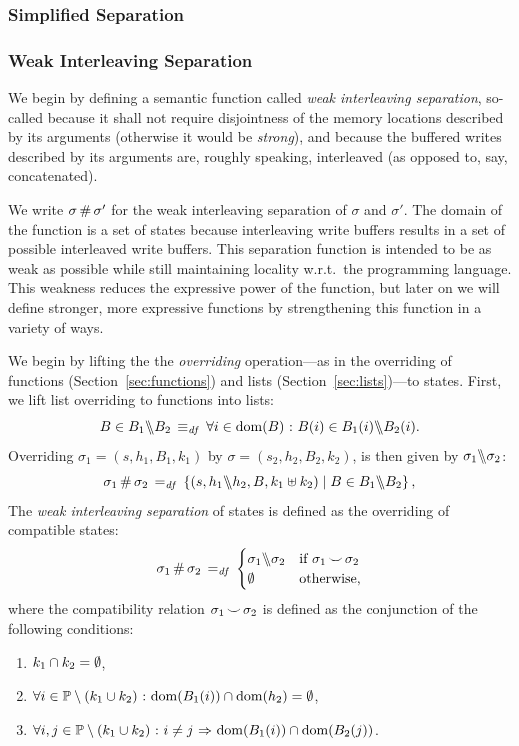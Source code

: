 \documentclass[11pt]{article}
\begin{document}
\subsubsection{Simplified Separation}



\subsubsection{Weak Interleaving Separation}

We begin by defining a semantic function called \emph{weak interleaving separation}, so-called because it shall not require disjointness of the memory locations described by its arguments (otherwise it would be \emph{strong}), and because the buffered writes described by its arguments are, roughly speaking, interleaved (as opposed to, say, concatenated). 

We write $\sigma \operatorname{\#} \sigma'$ for the weak interleaving separation of $\sigma$ and $\sigma'$. The domain of the function is a set of states because interleaving write buffers results in a set of possible interleaved write buffers. This separation function is intended to be as weak as possible while still maintaining locality w.r.t.\ the programming language. This weakness reduces the expressive power of the function, but later on we will define stronger, more expressive functions by strengthening this function in a variety of ways. 

We begin by lifting the the \emph{overriding} operation---as in the overriding of functions (Section~\ref{sec:functions}) and lists (Section~\ref{sec:lists})---to states. First, we lift list overriding to functions into lists: \[ B \in B_1 \backslash\!\!\backslash B_2 \operatorname{\;\equiv_{\mathit{df}}\;} \forall i \in \operatorname{\mathrm{dom}}(B) \operatorname{\,:\,} B(i) \in B_1(i) \backslash\!\!\backslash B_2(i). \] Overriding $\sigma_1 = (s,h_1,B_1,k_1)$ by $\sigma = (s_2,h_2,B_2,k_2)$, is then given by $\sigma_1 \backslash\!\!\backslash \sigma_2$: \[ \sigma_1 \operatorname{\#} \sigma_2 \operatorname{\;=_{\mathit{df}}\;} \left\lbrace (s,h_1 \backslash\!\!\backslash h_2, B,k_1 \uplus k_2) \mid B \in B_1 \backslash\!\!\backslash B_2 \right\rbrace,\] The \emph{weak interleaving separation} of states is defined as the overriding of compatible states: \[ \sigma_1 \operatorname{\#} \sigma_2 \operatorname{\;=_{\mathit{df}}\;} \begin{cases}
	\sigma_1 \backslash\!\!\backslash \sigma_2 & \text{if $\sigma_1 \operatorname{\smile} \sigma_2$} \\ 
	\operatorname{\emptyset} & \text{otherwise,} \end{cases} \] where the compatibility relation $\sigma_1 \operatorname{\smile} \sigma_2$ is defined as the conjunction of the following conditions: \begin{enumerate}
	\item $k_1 \cap k_2 = \operatorname{\emptyset}$,
	\item $\forall i \in \mathbb{P} \setminus (k_1 \cup k_2) \operatorname{\,:\,} \operatorname{\mathrm{dom}}(B_1(i)) \cap \operatorname{\mathrm{dom}}(h_2) = \operatorname{\emptyset}$, 
	\item $\forall i,j \in \mathbb{P} \setminus (k_1 \cup k_2) \operatorname{\,:\,} i \neq j \operatorname{\,\Rightarrow\,} \operatorname{\mathrm{dom}}(B_1(i)) \cap \operatorname{\mathrm{dom}}(B_2(j))$. 
\end{enumerate}
\end{document}
